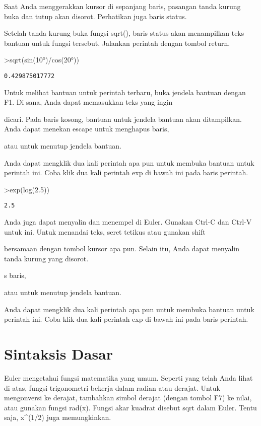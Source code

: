 \documentclass[
]{book}
\begin{document}
Saat Anda menggerakkan kursor di sepanjang baris, pasangan tanda kurung buka dan tutup akan disorot. Perhatikan juga baris status.

Setelah tanda kurung buka fungsi sqrt(), baris status akan menampilkan teks bantuan untuk fungsi tersebut. Jalankan perintah dengan tombol return.

\textgreater sqrt(sin(10°)/cos(20°))

\begin{verbatim}
0.429875017772
\end{verbatim}

Untuk melihat bantuan untuk perintah terbaru, buka jendela bantuan dengan F1. Di sana, Anda dapat memasukkan teks yang ingin

dicari. Pada baris kosong, bantuan untuk jendela bantuan akan ditampilkan. Anda dapat menekan escape untuk menghapus baris,

atau untuk menutup jendela bantuan.

Anda dapat mengklik dua kali perintah apa pun untuk membuka bantuan untuk perintah ini. Coba klik dua kali perintah exp di bawah ini pada baris perintah.

\textgreater exp(log(2.5))

\begin{verbatim}
2.5
\end{verbatim}

Anda juga dapat menyalin dan menempel di Euler. Gunakan Ctrl-C dan Ctrl-V untuk ini. Untuk menandai teks, seret tetikus atau gunakan shift

bersamaan dengan tombol kursor apa pun. Selain itu, Anda dapat menyalin tanda kurung yang disorot.

s baris,

atau untuk menutup jendela bantuan.

Anda dapat mengklik dua kali perintah apa pun untuk membuka bantuan untuk perintah ini. Coba klik dua kali perintah exp di bawah ini pada baris perintah.

\section{Sintaksis Dasar}\label{sintaksis-dasar}

Euler mengetahui fungsi matematika yang umum. Seperti yang telah Anda lihat di atas, fungsi trigonometri bekerja dalam radian atau derajat. Untuk mengonversi ke derajat, tambahkan simbol derajat (dengan tombol F7) ke nilai, atau gunakan fungsi rad(x). Fungsi akar kuadrat disebut sqrt dalam Euler. Tentu saja, x\^{}(1/2) juga memungkinkan.
\end{document}
